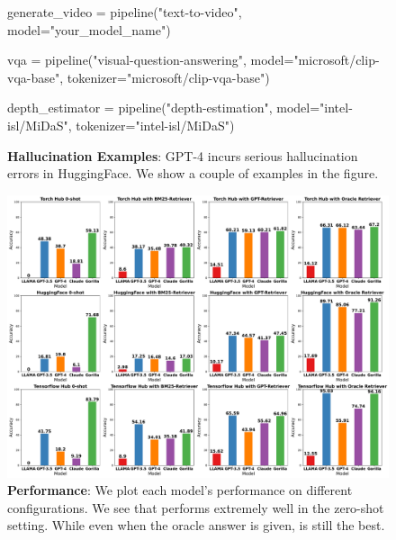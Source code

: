 \begin{figure}
\begin{tcolorbox}
    generate\_video = pipeline("text-to-video", model="your\_model\_name")
\end{tcolorbox}
\begin{tcolorbox}
    vqa = pipeline("visual-question-answering", model="microsoft/clip-vqa-base", tokenizer="microsoft/clip-vqa-base")
\end{tcolorbox}
\begin{tcolorbox}
    depth\_estimator = pipeline("depth-estimation", model="intel-isl/MiDaS", tokenizer="intel-isl/MiDaS")
\end{tcolorbox}
    \caption{\textbf{Hallucination Examples}: GPT-4 incurs serious hallucination errors in HuggingFace. We show a couple of examples in the figure.}
    \label{fig:hallucination}
\end{figure}


\begin{figure}[t]
    \includegraphics[width=\linewidth]{appendix_figures/grid_bars-3.pdf}
\caption{\footnotesize \textbf{ Performance}: We plot each model's performance on different configurations. We see that \gorilla{} performs extremely well in the zero-shot setting. While even when the oracle answer is given, \gorilla{} is still the best.}
\label{fig:full1}
\end{figure}

